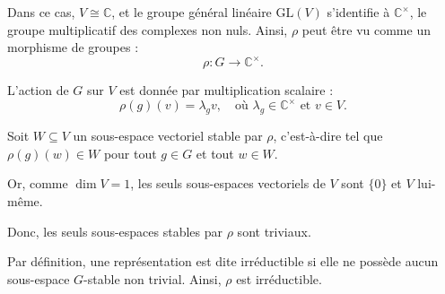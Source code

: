 \documentclass[12pt]{article}
\begin{document}
		Dans ce cas, \( V \cong \mathbb{C} \), et le groupe général linéaire \( \mathrm{GL}(V) \) s’identifie à \( \mathbb{C}^\times \), le groupe multiplicatif des complexes non nuls. Ainsi, \( \rho \) peut être vu comme un morphisme de groupes :
		\[
		\rho : G \to \mathbb{C}^\times.
		\]
		
		L'action de \( G \) sur \( V \) est donnée par multiplication scalaire :
		\[
		\rho(g)(v) = \lambda_g v, \quad \text{où } \lambda_g \in \mathbb{C}^\times \text{ et } v \in V.
		\]
		
		Soit \( W \subseteq V \) un sous-espace vectoriel stable par \( \rho \), c’est-à-dire tel que \( \rho(g)(w) \in W \) pour tout \( g \in G \) et tout \( w \in W \).
		
		Or, comme \( \dim V = 1 \), les seuls sous-espaces vectoriels de \( V \) sont \( \{0\} \) et \( V \) lui-même.
		
		Donc, les seuls sous-espaces stables par \( \rho \) sont triviaux.
		
		Par définition, une représentation est dite irréductible si elle ne possède aucun sous-espace \( G \)-stable non trivial. Ainsi, \( \rho \) est irréductible.
		

	
	
\end{document}
